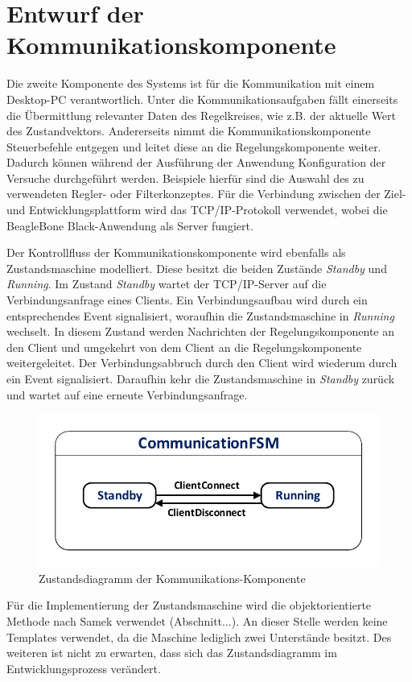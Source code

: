 \section{Entwurf der Kommunikationskomponente}
Die zweite Komponente des Systems ist für die Kommunikation mit einem Desktop-PC verantwortlich. Unter die Kommunikationsaufgaben fällt einerseits die Übermittlung relevanter Daten des Regelkreises, wie z.B. der aktuelle Wert des Zustandvektors. Andererseits nimmt die Kommunikationskomponente Steuerbefehle entgegen und leitet diese an die Regelungskomponente weiter. Dadurch können während der Ausführung der Anwendung Konfiguration der Versuche durchgeführt werden. Beispiele hierfür sind die Auswahl des zu verwendeten Regler- oder Filterkonzeptes. Für die Verbindung zwischen der Ziel- und Entwicklungsplattform wird das TCP/IP-Protokoll verwendet, wobei die BeagleBone Black-Anwendung als Server fungiert.

Der Kontrollfluss der Kommunikationskomponente wird ebenfalls als Zustandsmaschine modelliert. Diese besitzt die beiden Zustände \textit{Standby} und \textit{Running}. Im Zustand \textit{Standby} wartet der TCP/IP-Server auf die Verbindungsanfrage eines Clients. Ein Verbindungsaufbau wird durch ein entsprechendes Event signalisiert, woraufhin die Zustandsmaschine in \textit{Running} wechselt. In diesem Zustand werden Nachrichten der Regelungskomponente an den Client und umgekehrt von dem Client an die Regelungskomponente weitergeleitet. Der Verbindungsabbruch durch den Client wird wiederum durch ein Event signalisiert. Daraufhin kehr die Zustandsmaschine in \textit{Standby} zurück und wartet auf eine erneute Verbindungsanfrage.
\begin{figure}[h!]
\centering
\includegraphics[width=0.7\linewidth]{img/SW_4_CommComp_SC.pdf}
\caption{Zustandsdiagramm der Kommunikations-Komponente}
\end{figure}
Für die Implementierung der Zustandsmaschine wird die objektorientierte Methode nach Samek verwendet (Abschnitt...). An dieser Stelle werden keine Templates verwendet, da die Maschine lediglich zwei Unterstände besitzt. Des weiteren ist nicht zu erwarten, dass sich das Zustandsdiagramm im Entwicklungsprozess verändert.

